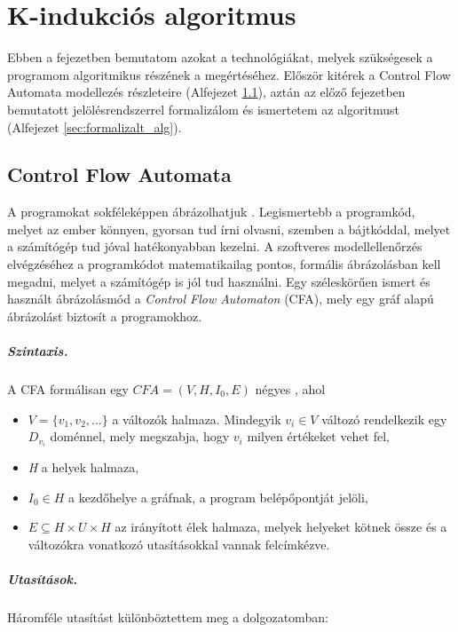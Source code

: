 \chapter{K-indukciós algoritmus}

Ebben a fejezetben bemutatom azokat a technológiákat, melyek szükségesek a programom algoritmikus részének a megértéséhez. Először kitérek a Control Flow Automata modellezés részleteire (Alfejezet \ref{sec:control_flow_automata}), aztán az előző fejezetben bemutatott jelölésrendszerrel formalizálom és ismertetem az algoritmust (Alfejezet \ref{sec:formalizalt_alg}).

\section{Control Flow Automata}
\label{sec:control_flow_automata}

A programokat sokféleképpen ábrázolhatjuk \cite{soft_ver_akos}. Legismertebb a programkód, melyet az ember könnyen, gyorsan tud írni olvasni, szemben a bájtkóddal, melyet a számítógép tud jóval hatékonyabban kezelni. A szoftveres modellellenőrzés elvégzéséhez a programkódot matematikailag pontos, formális ábrázolásban kell megadni, melyet a számítógép is jól tud használni. Egy széleskörűen ismert és használt ábrázolásmód a \emph{Control Flow Automaton} (CFA), mely egy gráf alapú ábrázolást biztosít a programokhoz. 

\paragraph{Szintaxis.}
A CFA  formálisan egy $\mathit{CFA} = (V, H, I_0, E)$ négyes \cite{beyer13}, ahol

\begin{itemize}
	\item $V = \{v_1, v_2, \ldots\}$ a változók halmaza. Mindegyik $v_i \in V$ változó rendelkezik egy $D_{v_i}$ doménnel, mely megszabja, hogy $v_i$ milyen értékeket vehet fel,
	\item \emph{H} a helyek halmaza,
	\item $I_0 \in H$ a kezdőhelye a gráfnak, a program belépőpontját jelöli,
	\item $E \subseteq H \times U \times H$ az irányított élek halmaza, melyek helyeket kötnek össze és a változókra vonatkozó utasításokkal vannak felcímkézve.
\end{itemize}

\paragraph{Utasítások.}
Háromféle utasítást különböztettem meg a dolgozatomban: 

